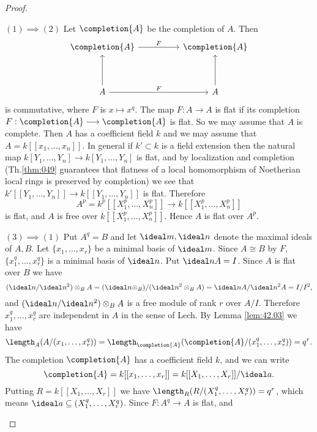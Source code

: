 \documentclass[../main]{subfiles}
\begin{document}
\begin{proof}\phantom{,}
\begin{implyenumerate}
    \item[$(1)\implies(2)$] Let $\completion{A}$ be the completion of $A$. Then
    \[\begin{tikzcd}
    	{\completion{A}} && {\completion{A}} \\
    	\\
	    A && A
    	\arrow[from=3-3, to=1-3]
    	\arrow[from=3-1, to=1-1]
    	\arrow["F", from=3-1, to=3-3]
    	\arrow["F", from=1-1, to=1-3]
    \end{tikzcd}\]
    is commutative, where $F$ is $x \mapsto x^q$. The map $F: A\longrightarrow A$ is flat if its completion $F: \completion{A}\longrightarrow \completion{A}$ is flat. So we may assume that $A$ is complete. Then $A$ has a coefficient field $k$ and we may assume that $A=k[[x_1, \ldots, x_n]]$. In general if $k' \subset k$ is a field extension then the natural map \newline $k[Y_1, \ldots, Y_n] \longrightarrow k[Y_1, \ldots, Y_n]$ is flat, and by localization and completion (Th.\ref{thm:049} guarantees that flatness of a local homomorphism of Noetherian local rings is preserved by completion) we see that \newline $k'[[Y_1, \ldots, Y_n]]\longrightarrow k[[Y_1, \ldots, Y_n]]$ is flat. Therefore \[A^p=k^p[[X_1^p, \ldots, X_n^p]]\longrightarrow k[[X_1^p, \ldots, X_n^p]]\] is flat, and $A$ is free over $k[[X_1^p, \ldots, X_n^p]]$. Hence $A$ is flat over $A^p$.
    \item[$(3)\implies(1)$] Put $A^q=B$ and let $\ideal m, \ideal n$ denote the maximal ideals of $A, B$. Let $\{x_1, \ldots, x_r\}$ be a minimal basis of $\ideal m$. Since $A \cong B$ by $F$, $\{x_1^q, \ldots, x_r^q\}$ is a minimal basis of $\ideal n$. Put $\ideal nA=I$. Since $A$ is flat over $B$ we have \[(\ideal n/\ideal n^2)\otimes_B A=(\ideal n\otimes_B)/(\ideal n^2\otimes_BA)=\ideal nA/\ideal n^2A=I/I^2,\] and $(\ideal n/\ideal n^2)\otimes_BA$ is a free module of rank $r$ over $A/I$. Therefore $x_1^q,\ldots,x_r^q$ are independent in $A$ in the sense of Lech. By Lemma \ref{lem:42.03} we have \[\length_A(A/(x_1,\ldots,x_r^q))=\length_{\completion{A}}(\completion{A}/(x_1^q,\ldots,x_r^q))=q^r.\] The completion $\completion{A}$ has a coefficient field $k$, and we can write \[\completion{A}=k[[x_1,\ldots,x_r]]=k[[X_1,\dots,X_r]]/\ideal a.\] Putting $R=k[[X_1,\dots,X_r]]$ we have $\length_R(R/(X_1^q,\ldots,X_r^q))=q^r$, which means $\ideal a\subseteq(X_1^q,\ldots,X_r^q)$. Since $F:A^q\longrightarrow A$ is flat, and

\end{implyenumerate}
\end{proof}
\end{document}

